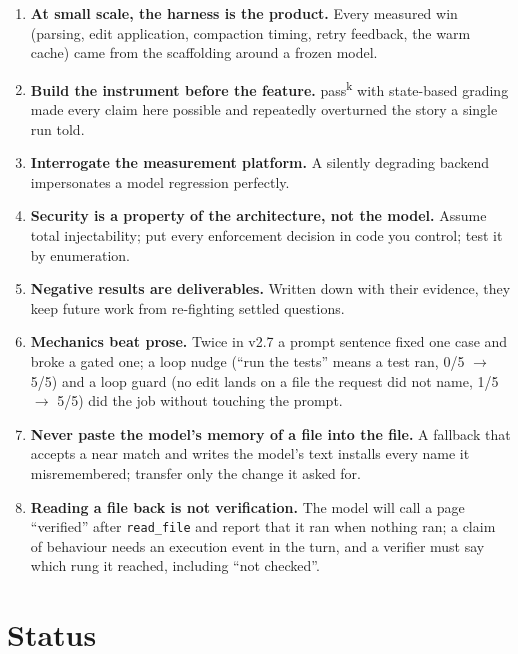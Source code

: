 \documentclass[11pt]{article}
\newcommand{\code}[1]{\texttt{\small #1}}
\begin{document}
\begin{enumerate}[itemsep=2pt]
\item \textbf{At small scale, the harness is the product.} Every measured win
(parsing, edit application, compaction timing, retry feedback, the warm
cache) came from the scaffolding around a frozen model.
\item \textbf{Build the instrument before the feature.}
pass\textsuperscript{k} with state-based grading made every claim here
possible and repeatedly overturned the story a single run told.
\item \textbf{Interrogate the measurement platform.} A silently degrading
backend impersonates a model regression perfectly.
\item \textbf{Security is a property of the architecture, not the model.}
Assume total injectability; put every enforcement decision in code you
control; test it by enumeration.
\item \textbf{Negative results are deliverables.} Written down with their
evidence, they keep future work from re-fighting settled questions.
\item \textbf{Mechanics beat prose.} Twice in v2.7 a prompt sentence fixed
one case and broke a gated one; a loop nudge (``run the tests'' means a test
ran, 0/5 $\to$ 5/5) and a loop guard (no edit lands on a file the request did
not name, 1/5 $\to$ 5/5) did the job without touching the prompt.
\item \textbf{Never paste the model's memory of a file into the file.} A
fallback that accepts a near match and writes the model's text installs
every name it misremembered; transfer only the change it asked for.
\item \textbf{Reading a file back is not verification.} The model will call
a page ``verified'' after \code{read\_file} and report that it ran when
nothing ran; a claim of behaviour needs an execution event in the turn, and
a verifier must say which rung it reached, including ``not checked''.
\end{enumerate}

\section{Status}
\end{document}
